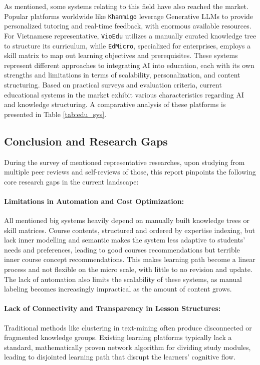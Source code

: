 As mentioned, some systems relating to this field have also reached the market. Popular platforms worldwide like \texttt{Khanmigo} leverage 
Generative LLMs to provide personalized tutoring and real-time feedback, with enormous available resources.
For Vietnamese representative, \texttt{VioEdu} utilizes a manually curated knowledge tree to structure its curriculum, while 
\texttt{EdMicro}, specialized for enterprises, employs a skill matrix to map out learning objectives and prerequisites. 
 These systems represent different approaches to integrating AI into education, each with its own strengths and limitations in terms of scalability, personalization, and content structuring.
Based on practical surveys and evaluation criteria, current educational systems in the market exhibit various characteristics regarding AI and knowledge structuring. A comparative analysis of these platforms is presented in Table \ref{tab:edu_sys}.



\subsection{Conclusion and Research Gaps}\label{sub:gaps}
During the survey of mentioned representative researches, upon studying from multiple peer reviews and self-reviews of those, this report pinpoints the following core 
research gaps in the current landscape:

\paragraph*{{Limitations in Automation and Cost Optimization:}} All mentioned big systems heavily depend on manually built knowledge trees or skill matrices. Course contents, 
structured and ordered by expertise indexing, but lack inner modelling and semantic makes the system less adaptive to students' needs and preferences, 
leading to good courses recommendations but terrible inner course concept recommendations.
This makes learning path become a linear process and not flexible on the micro scale, with little to no revision and update. 
The lack of automation also limits the scalability of these systems, as manual labeling becomes increasingly impractical as the amount of content grows.
\paragraph*{{Lack of Connectivity and Transparency in Lesson Structures:}} Traditional methods like clustering in text-mining often produce disconnected 
or fragmented knowledge groups. Existing learning platforms typically lack a standard, mathematically proven network algorithm for dividing study modules, leading 
to disjointed learning path that disrupt the learners' cognitive flow.
    

